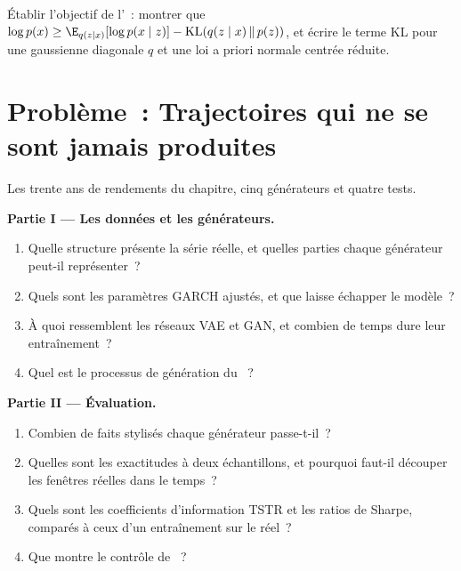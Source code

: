 \begin{exercise}[$\star\star\star$]\label{exo:ml:generative-models-and-synthetic-data:8}
Établir l'objectif de l'~: montrer que $\log p(x)\ge\E_{q(z\mid x)}[\log p(x\mid z)] - \mathrm{KL}(q(z\mid x)\,\|\,p(z))$, et
écrire le terme KL pour une gaussienne diagonale $q$ et une loi a priori normale centrée réduite.
\end{exercise}

\section{Problème~: Trajectoires qui ne se sont jamais produites}

\begin{problem}\label{pb:ml:generative-models-and-synthetic-data:1}
Les trente ans de rendements du chapitre, cinq générateurs et quatre tests.

\medskip\noindent\textbf{Partie I --- Les données et les générateurs.}
\begin{enumerate}
\item Quelle structure présente la série réelle, et quelles parties chaque générateur peut-il représenter~?
\item Quels sont les paramètres GARCH ajustés, et que laisse échapper le modèle~?
\item À quoi ressemblent les réseaux VAE et GAN, et combien de temps dure leur entraînement~?
\item Quel est le processus de génération du ~?
\end{enumerate}

\medskip\noindent\textbf{Partie II --- Évaluation.}
\begin{enumerate}[resume]
\item Combien de faits stylisés chaque générateur passe-t-il~?
\item Quelles sont les exactitudes à deux échantillons, et pourquoi faut-il découper les fenêtres réelles dans le temps~?
\item Quels sont les coefficients d'information TSTR et les ratios de Sharpe, comparés à ceux d'un entraînement sur le réel~?
\item Que montre le contrôle de ~?
\end{enumerate}


\end{problem}
